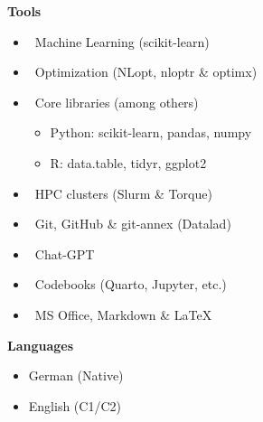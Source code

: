\documentclass[10pt,a4paper,ragged2e,withhyper]{altacv}
\begin{document}
\begin{paracol}{2}
\bfseries\textcolor{emphasis}{Tools}\\
\vspace{0.8em}
\begin{itemize}[label={}, left=0pt, itemsep=5pt, topsep=0pt]
    \item \faLayerGroup{}\ Machine Learning \textnormal{(scikit-learn)}
    \item \faBullseye{}\ Optimization \textnormal{(NLopt, nloptr \& optimx)}
    \item \faBoxes{}\ Core libraries \textnormal{(among others)}
    \begin{itemize}[left=7pt, itemsep=2pt, topsep=2pt]
        \item Python: \textnormal{scikit-learn, pandas, numpy}
        \item R: \textnormal{data.table, tidyr, ggplot2}
    \end{itemize}
    \item \faServer{}\ HPC clusters (\textnormal{Slurm \& Torque)}
    \item \faGit*{}\ Git, GitHub \& git-annex \textnormal{(Datalad)}
    \item \faLaptop{}\ Chat-GPT
    \item \faBook{}\ Codebooks \textnormal{(Quarto, Jupyter, etc.)}
    \item \faPencil*{}\ MS Office, Markdown \& LaTeX
\end{itemize}

\divider{}

\bfseries\textcolor{emphasis}{Languages}
\vspace{1ex}
\begin{itemize}
    \item German (Native)
    \item English (C1/C2)
\end{itemize}
\vspace{0.5ex}

\medskip


\medskip

\end{paracol}
\end{document}
